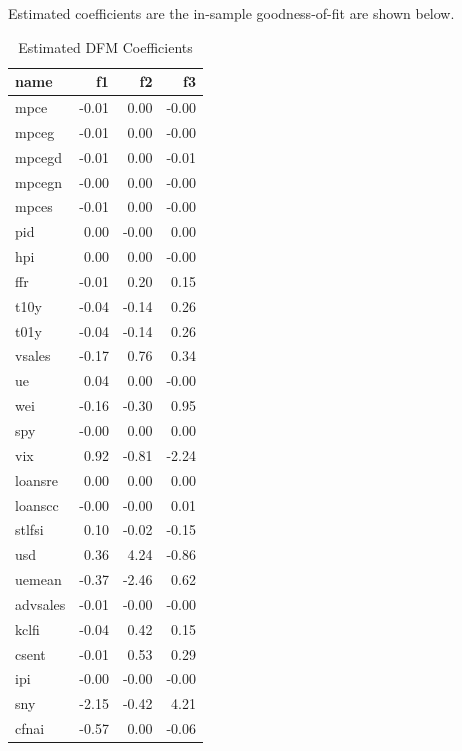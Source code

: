 \documentclass[11pt, letterpaper]{article}\usepackage[]{graphicx}\usepackage[]{color}
\begin{document}
Estimated coefficients are the in-sample goodness-of-fit are shown below.
\begin{table}[!h]
\centering
\begingroup\footnotesize
\begin{tabular}{lrrr}
  \hline
name & f1 & f2 & f3 \\ 
  \hline
mpce & -0.01 & 0.00 & -0.00 \\ 
  mpceg & -0.01 & 0.00 & -0.00 \\ 
  mpcegd & -0.01 & 0.00 & -0.01 \\ 
  mpcegn & -0.00 & 0.00 & -0.00 \\ 
  mpces & -0.01 & 0.00 & -0.00 \\ 
  pid & 0.00 & -0.00 & 0.00 \\ 
  hpi & 0.00 & 0.00 & -0.00 \\ 
  ffr & -0.01 & 0.20 & 0.15 \\ 
  t10y & -0.04 & -0.14 & 0.26 \\ 
  t01y & -0.04 & -0.14 & 0.26 \\ 
  vsales & -0.17 & 0.76 & 0.34 \\ 
  ue & 0.04 & 0.00 & -0.00 \\ 
  wei & -0.16 & -0.30 & 0.95 \\ 
  spy & -0.00 & 0.00 & 0.00 \\ 
  vix & 0.92 & -0.81 & -2.24 \\ 
  loansre & 0.00 & 0.00 & 0.00 \\ 
  loanscc & -0.00 & -0.00 & 0.01 \\ 
  stlfsi & 0.10 & -0.02 & -0.15 \\ 
  usd & 0.36 & 4.24 & -0.86 \\ 
  uemean & -0.37 & -2.46 & 0.62 \\ 
  advsales & -0.01 & -0.00 & -0.00 \\ 
  kclfi & -0.04 & 0.42 & 0.15 \\ 
  csent & -0.01 & 0.53 & 0.29 \\ 
  ipi & -0.00 & -0.00 & -0.00 \\ 
  sny & -2.15 & -0.42 & 4.21 \\ 
  cfnai & -0.57 & 0.00 & -0.06 \\ 
   \hline
\end{tabular}
\endgroup
\caption{Estimated DFM Coefficients} 
\end{table}
\end{document}
